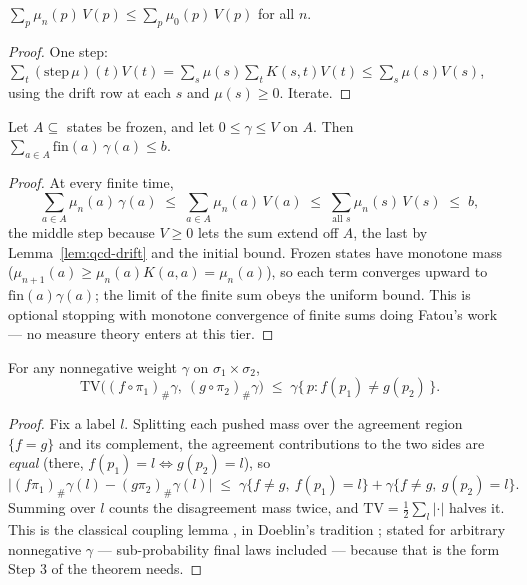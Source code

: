 \begin{blemma}\label{lem:qcd-drift}
$\sum_p \mu_n(p)\, V(p) \leq \sum_p \mu_0(p)\, V(p)$ for all $n$.
\end{blemma}
\begin{proof}
One step: $\sum_t (\mathrm{step}\,\mu)(t) V(t) = \sum_s \mu(s)
\sum_t K(s, t) V(t) \leq \sum_s \mu(s) V(s)$, using the drift row at
each $s$ and $\mu(s) \geq 0$. Iterate.
\end{proof}

\begin{blemma}\label{lem:qcd-stop}
Let $A \subseteq$ states be frozen, and let $0 \leq \gamma \leq V$ on
$A$. Then $\sum_{a \in A} \mathrm{fin}(a)\, \gamma(a) \leq b$.
\end{blemma}
\begin{proof}
At every finite time,
\[
\sum_{a \in A} \mu_n(a)\, \gamma(a)
\;\leq\; \sum_{a \in A} \mu_n(a)\, V(a)
\;\leq\; \sum_{\text{all } s} \mu_n(s)\, V(s)
\;\leq\; b,
\]
the middle step because $V \geq 0$ lets the sum extend off $A$, the
last by Lemma~\ref{lem:qcd-drift} and the initial bound. Frozen states
have monotone mass ($\mu_{n+1}(a) \geq \mu_n(a) K(a,a) = \mu_n(a)$), so
each term converges upward to $\mathrm{fin}(a)\gamma(a)$; the limit of
the finite sum obeys the uniform bound. This is optional stopping with
monotone convergence of finite sums doing Fatou's work --- no measure
theory enters at this tier.
\end{proof}

\begin{blemma}\label{lem:qcd-couple}
For any nonnegative weight $\gamma$ on $\sigma_1 \times \sigma_2$,
\[
\mathrm{TV}\bigl((f \circ \pi_1)_{\#}\gamma,\ (g \circ \pi_2)_{\#}\gamma\bigr)
\;\leq\; \gamma\{\, p : f(p_1) \neq g(p_2) \,\}.
\]
\end{blemma}
\begin{proof}
Fix a label $l$. Splitting each pushed mass over the agreement region
$\{f = g\}$ and its complement, the agreement contributions to the two
sides are \emph{equal} (there, $f(p_1) = l \iff g(p_2) = l$), so
\[
\bigl| (f\pi_1)_{\#}\gamma(l) - (g\pi_2)_{\#}\gamma(l) \bigr|
\;\leq\; \gamma\{f \neq g,\ f(p_1) = l\} + \gamma\{f \neq g,\ g(p_2) = l\}.
\]
Summing over $l$ counts the disagreement mass twice, and
$\mathrm{TV} = \tfrac12 \sum_l |\cdot|$ halves it. This is the
classical coupling lemma \cite[\S I.2]{lindvall1992}, in Doeblin's
tradition \cite{doeblin1938}; stated for arbitrary nonnegative
$\gamma$ --- sub-probability final laws included --- because that is the
form Step 3 of the theorem needs.
\end{proof}

